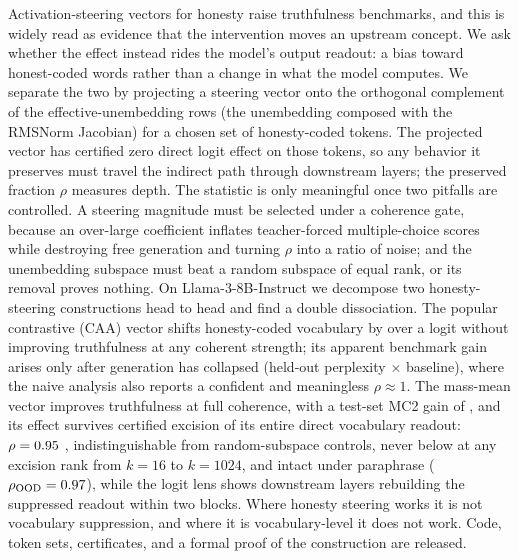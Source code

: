 Activation-steering vectors for honesty raise truthfulness benchmarks, and this is widely read as evidence that the intervention moves an upstream concept. We ask whether the effect instead rides the model's output readout: a bias toward honest-coded words rather than a change in what the model computes. We separate the two by projecting a steering vector onto the orthogonal complement of the effective-unembedding rows (the unembedding composed with the RMSNorm Jacobian) for a chosen set of honesty-coded tokens. The projected vector has certified zero direct logit effect on those tokens, so any behavior it preserves must travel the indirect path through downstream layers; the preserved fraction $\rho$ measures depth. The statistic is only meaningful once two pitfalls are controlled. A steering magnitude must be selected under a coherence gate, because an over-large coefficient inflates teacher-forced multiple-choice scores while destroying free generation and turning $\rho$ into a ratio of noise; and the unembedding subspace must beat a random subspace of equal rank, or its removal proves nothing. On Llama-3-8B-Instruct we decompose two honesty-steering constructions head to head and find a double dissociation. The popular contrastive (CAA) vector shifts honesty-coded vocabulary by over a logit without improving truthfulness at any coherent strength; its apparent benchmark gain arises only after generation has collapsed (held-out perplexity \NaivePplRatio$\times$ baseline), where the naive analysis also reports a confident and meaningless $\rho \approx 1$. The mass-mean vector improves truthfulness at full coherence, with a test-set MC2 gain of \MmTestDelta, and its effect survives certified excision of its entire direct vocabulary readout: $\rho = 0.95$ \MmRhoAlSixtyFourCI, indistinguishable from random-subspace controls, never below \MmRhoKMin{} at any excision rank from $k{=}16$ to $k{=}1024$, and intact under paraphrase ($\rho_{\mathrm{OOD}} = 0.97$), while the logit lens shows downstream layers rebuilding the suppressed readout within two blocks. Where honesty steering works it is not vocabulary suppression, and where it is vocabulary-level it does not work. Code, token sets, certificates, and a formal proof of the construction are released.
